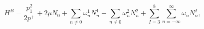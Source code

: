 \begin{equation}
H^B = \frac{p_1^2}{2 p^+} + 2 \mu N_0 + 
\sum_{n \neq 0}  \omega^1_n N^1_n  +
\sum_{n \neq 0}  \omega^2_n N^2_n +
\sum_{I=3}^8 \sum_{n = -\infty}^{\infty} \omega_n N_n^{I},
\end{equation}

